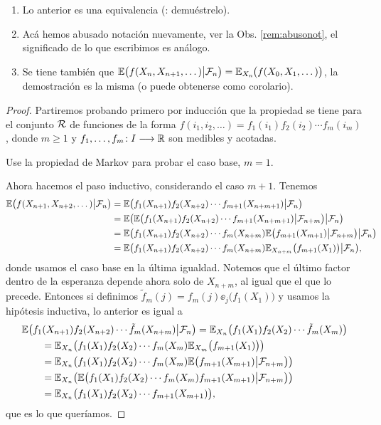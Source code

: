 \begin{rem}
\leavevmode
\begin{enumerate}[label=(\roman*)]
\item Lo anterior es una equivalencia (\uexers{}: demuéstrelo).
\item Acá hemos abusado notación nuevamente, ver la Obs. \ref{rem:abusonot}, el significado de lo que escribimos es análogo.
\item Se tiene también que $\mathbb{E}\big(f(X_{n},X_{n+1},\dotsc)\big|\mathcal{F}_n\big)=\mathbb{E}_{X_n}\hspace{-0.1em}\big(f(X_0,X_1,\dotsc)\big)$, la demostración es la misma (o puede obtenerse como corolario).
\end{enumerate}
\end{rem}

\begin{proof}
Partiremos probando primero por inducción que la propiedad se tiene para el conjunto ${\cal R}$ de funciones de la forma $f(i_1,i_2,\dotsc)=f_1(i_1)f_2(i_2)\dotsm f_m(i_m)$, donde $m\geq1$ y $f_1,\dotsc,f_m\!:I\longrightarrow\mathbb{R}$ son medibles y acotadas.

\begin{exer}
Use la propiedad de Markov para probar el caso base, $m=1$.
\end{exer}

Ahora hacemos el paso inductivo, considerando el caso $m+1$.
Tenemos
\begin{align}
\ee\big(f(X_{n+1},X_{n+2},\dotsc)\big|\cf_n\big)&=\ee\big(f_1(X_{n+1})f_2(X_{n+2})\dotsm f_{m+1}(X_{n+m+1})\big|\cf_n\big)\\
&=\ee\big(\ee\big(f_1(X_{n+1})f_2(X_{n+2})\dotsm f_{m+1}(X_{n+m+1})\big|\cf_{n+m}\big)\big|\cf_n\big)\\
&=\ee\big(f_1(X_{n+1})f_2(X_{n+2})\dotsm f_{m}(X_{n+m})\ee\big(f_{m+1}(X_{m+1})\big|\cf_{n+m}\big)\big|\cf_n\big)\hskip-15pt\\
&=\ee\big(f_1(X_{n+1})f_2(X_{n+2})\dotsm f_{m}(X_{n+m})\ee_{X_{n+m}}\big(f_{m+1}(X_1)\big)\big|\cf_n\big),
\end{align}
donde usamos el caso base en la última igualdad.
Notemos que el último factor dentro de la esperanza depende ahora solo de $X_{n+m}$, al igual que el que lo precede.
Entonces si definimos $\tilde f_m(j)=f_m(j)\ee_{j}\big(f_1(X_1)\big)$ y usamos la hipótesis inductiva, lo anterior es igual a
\begin{align}
&\mathbb{E}\big(f_1(X_{n+1})f_2(X_{n+2})\dotsm \tilde f_{m}(X_{n+m})\big|\mathcal{F}_n\big)
=\mathbb{E}_{X_n}\big(f_1(X_{1})f_2(X_{2})\dotsm \tilde f_{m}(X_{m})\big)\\
&\qquad=\mathbb{E}_{X_n}\big(f_1(X_{1})f_2(X_{2})\dotsm f_{m}(X_{m})\mathbb{E}_{X_{m}}\big(f_{m+1}(X_1)\big)\big)\\
&\qquad=\mathbb{E}_{X_n}\big(f_1(X_{1})f_2(X_{2})\dotsm f_{m}(X_{m})\mathbb{E}\big(f_{m+1}(X_{m+1})\big|\mathcal{F}_{n+m}\big)\big)\\
&\qquad=\mathbb{E}_{X_n}\big(\mathbb{E}\big(f_1(X_{1})f_2(X_{2})\dotsm f_{m}(X_{m})f_{m+1}(X_{m+1})\big|\mathcal{F}_{n+m}\big)\big)\\
&\qquad=\mathbb{E}_{X_n}\big(f_1(X_{1})f_2(X_{2})\dotsm f_{m+1}(X_{m+1})\big),
\end{align}
que es lo que queríamos.


\end{proof}
